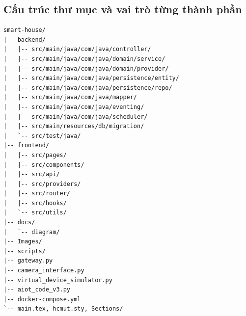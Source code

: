 \subsection{Cấu trúc thư mục và vai trò từng thành phần}

\begin{verbatim}
smart-house/
|-- backend/
|   |-- src/main/java/com/java/controller/
|   |-- src/main/java/com/java/domain/service/
|   |-- src/main/java/com/java/domain/provider/
|   |-- src/main/java/com/java/persistence/entity/
|   |-- src/main/java/com/java/persistence/repo/
|   |-- src/main/java/com/java/mapper/
|   |-- src/main/java/com/java/eventing/
|   |-- src/main/java/com/java/scheduler/
|   |-- src/main/resources/db/migration/
|   `-- src/test/java/
|-- frontend/
|   |-- src/pages/
|   |-- src/components/
|   |-- src/api/
|   |-- src/providers/
|   |-- src/router/
|   |-- src/hooks/
|   `-- src/utils/
|-- docs/
|   `-- diagram/
|-- Images/
|-- scripts/
|-- gateway.py
|-- camera_interface.py
|-- virtual_device_simulator.py
|-- aiot_code_v3.py
|-- docker-compose.yml
`-- main.tex, hcmut.sty, Sections/
\end{verbatim}

